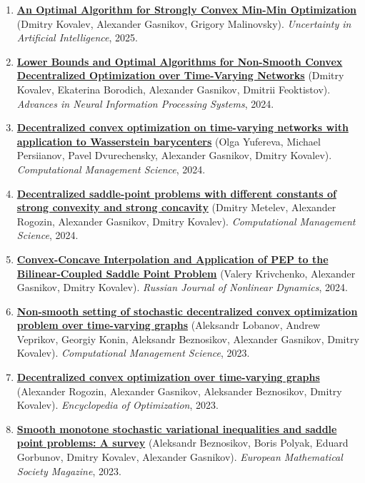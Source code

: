 \begin{enumerate}
\item
\textbf{\href{https://proceedings.mlr.press/v286/kovalev25a.html}{An Optimal Algorithm for Strongly Convex Min-Min Optimization}} (Dmitry Kovalev, Alexander Gasnikov, Grigory Malinovsky). \textit{Uncertainty in Artificial Intelligence}, 2025.
\item
\textbf{\href{https://proceedings.neurips.cc/paper_files/paper/2024/hash/af10f27d0a48175e486a647c06c7a9c6-Abstract-Conference.html}{Lower Bounds and Optimal Algorithms for Non-Smooth Convex Decentralized Optimization over Time-Varying Networks}} (Dmitry Kovalev, Ekaterina Borodich, Alexander Gasnikov, Dmitrii Feoktistov). \textit{Advances in Neural Information Processing Systems}, 2024.
\item
\textbf{\href{https://link.springer.com/article/10.1007/s10287-023-00493-9}{Decentralized convex optimization on time-varying networks with application to Wasserstein barycenters}} (Olga Yufereva, Michael Persiianov, Pavel Dvurechensky, Alexander Gasnikov, Dmitry Kovalev). \textit{Computational Management Science}, 2024.
\item
\textbf{\href{https://link.springer.com/article/10.1007/s10287-023-00485-9}{Decentralized saddle-point problems with different constants of strong convexity and strong concavity}} (Dmitry Metelev, Alexander Rogozin, Alexander Gasnikov, Dmitry Kovalev). \textit{Computational Management Science}, 2024.
\item
\textbf{\href{https://www.mathnet.ru/eng/nd/v20/i5/p875}{Convex-Concave Interpolation and Application of PEP to the Bilinear-Coupled Saddle Point Problem}} (Valery Krivchenko, Alexander Gasnikov, Dmitry Kovalev). \textit{Russian Journal of Nonlinear Dynamics}, 2024.
\item
\textbf{\href{https://link.springer.com/article/10.1007/s10287-023-00479-7}{Non-smooth setting of stochastic decentralized convex optimization problem over time-varying graphs}} (Aleksandr Lobanov, Andrew Veprikov, Georgiy Konin, Aleksandr Beznosikov, Alexander Gasnikov, Dmitry Kovalev). \textit{Computational Management Science}, 2023.
\item
\textbf{\href{https://link.springer.com/content/pdf/10.1007/978-3-030-54621-2_860-1.pdf}{Decentralized convex optimization over time-varying graphs}} (Alexander Rogozin, Alexander Gasnikov, Aleksander Beznosikov, Dmitry Kovalev). \textit{Encyclopedia of Optimization}, 2023.
\item
\textbf{\href{https://ems.press/journals/mag/articles/9939904}{Smooth monotone stochastic variational inequalities and saddle point problems: A survey}} (Aleksandr Beznosikov, Boris Polyak, Eduard Gorbunov, Dmitry Kovalev, Alexander Gasnikov). \textit{European Mathematical Society Magazine}, 2023.

\end{enumerate}
